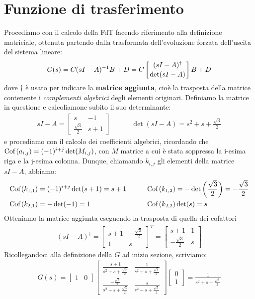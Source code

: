 \documentclass[a4paper, 11pt]{article}
\begin{document}
\section{Funzione di trasferimento}
Procediamo con il calcolo della FdT facendo riferimento alla definizione matriciale, ottenuta partendo dalla trasformata dell'evoluzione forzata dell'uscita del sistema lineare:
\begin{align*}
	G(s) = C(sI-A)^{-1}B +D = C\left[ \frac{(sI-A)^\dag}{\det(sI-A)} \right]B + D
\end{align*}
dove $\dag$ è usato per indicare la \textbf{matrice aggiunta}, cioè la trasposta della matrice contenente i \textit{complementi algebrici} degli elementi originari. Definiamo la matrice in questione e calcoliamone subito il suo determinante:
\begin{align*}
	sI-A = \begin{bmatrix}
		s & -1 \\ \frac{\sqrt{3}}{2} & s+1
	\end{bmatrix} \quad \quad \quad \det(sI-A) = s^2+s +\frac{\sqrt{3}}{2}
\end{align*}
e procediamo con il calcolo dei coefficienti algebrici, ricordando che $\textrm{Cof}\left( a_{i,j} \right) = (-1)^{i+j}\det(M_{i,j})$, con $M$ matrice a cui è stata soppressa la i-esima riga e la j-esima colonna. Dunque, chiamando $k_{i,j}$ gli elementi della matrice $sI-A$, abbiamo:
\begin{align*}
	\textrm{Cof}\left( k_{1,1} \right) & = (-1)^{i+j} \det(s+1) = s+1 \quad & \quad \textrm{Cof}\left( k_{1,2} \right) & = -\det\left( \frac{\sqrt{3}}{2} \right) = -\frac{\sqrt{3}}{2} \\
	\textrm{Cof}\left( k_{2,1} \right) & = -\det(-1) = 1 \quad & \quad \textrm{Cof}\left( k_{2,2} \right) & \det(s) = s 
\end{align*}
Otteniamo la matrice aggiunta eseguendo la trasposta di quella dei cofattori
\begin{align*}
	(sI-A)^\dag = \begin{bmatrix}
		s+1 & -\frac{\sqrt{3}}{2} \\ 
		1 & s
	\end{bmatrix}^T = \begin{bmatrix}
		s+ 1 & 1 \\
		-\frac{\sqrt{3}}{2} & s
	\end{bmatrix}
\end{align*}
Ricollegandoci alla definizione della $G$ ad inizio sezione, scriviamo:
\begin{align*}
	G(s) = \begin{bmatrix} 1 & 0 \end{bmatrix} \begin{bmatrix}
		\frac{s+1}{s^2+s + \frac{\sqrt{3}}{2}} & \frac{1}{s^2+s + \frac{\sqrt{3}}{2}} \\
		\frac{ -\frac{\sqrt{3}}{2}}{s^2+s + \frac{\sqrt{3}}{2}} & \frac{s}{s^2+s + \frac{\sqrt{3}}{2}}
	\end{bmatrix} \begin{bmatrix}
		0 \\ 1
	\end{bmatrix} = \frac{1}{s^2+s + \frac{\sqrt{3}}{2}}
\end{align*}
\end{document}
